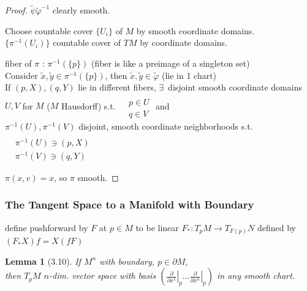 \documentclass[11pt]{amsart}
\newtheorem{lemma}{Lemma}
\theoremstyle{definition}
\begin{document}
\begin{proof}
$\widetilde{\psi} \widetilde{\varphi}^{-1}$ clearly smooth.

Choose countable cover $\lbrace U_i \rbrace$ of $M$ by smooth coordinate domains.  \\
$\lbrace \pi^{-1}(U_i) \rbrace$ countable cover of $TM$ by coordinate domains.

fiber of $\pi$ : $\pi^{-1}( \lbrace p \rbrace)$ (fiber is like a preimage of a singleton set) \\
Consider $\widetilde{x}, \widetilde{y} \in \pi^{-1}(\lbrace p \rbrace)$, then $\widetilde{x}, \widetilde{y} \in \widetilde{\varphi}$ (lie in 1 chart) \\
If $(p,X), (q,Y)$ lie in different fibers, $\exists \, $ disjoint smooth coordinate domains $U,V$ for $M$ ($M$ Hausdorff) s.t. $\begin{aligned} & \quad \\
  & p \in U \\
  & q \in V \end{aligned}$ and  \\
$\pi^{-1}(U), \pi^{-1}(V)$ disjoint, smooth coordinate neighborhoods s.t. $\begin{aligned} & \quad \\
  & \pi^{-1}(U) \ni (p,X) \\
  & \pi^{-1}(V) \ni (q,Y) \end{aligned}$

$\pi(x,v) = x$, so $\pi$ smooth.

\end{proof}




\subsubsection*{The Tangent Space to a Manifold with Boundary}


define pushforward by $F$ at $p\in M$ to be linear $F_*:T_pM \to T_{F(p)}N$ defined by $(F_*X)f = X(fF)$

\begin{lemma}[3.10] If $M^n$ with boundary, $p\in \partial M$, \\
then $T_pM$ $n$-dim. vector space with basis $\left( \left. \frac{ \partial }{ \partial x^1 } \right|_p \dots \left. \frac{ \partial }{ \partial x^n } \right|_p \right)$ in any smooth chart.
\end{lemma}
\end{document}
